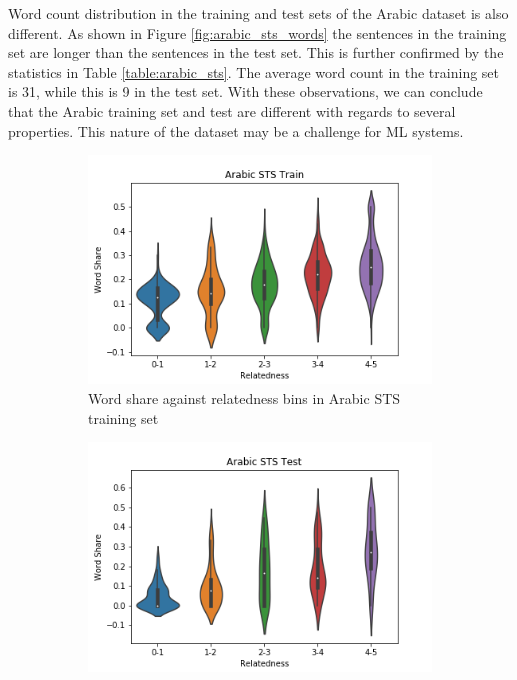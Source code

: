\begin{enumerate}
Word count distribution in the training and test sets of the Arabic dataset is also different. As shown in Figure \ref{fig:arabic_sts_words} the sentences in the training set are longer than the sentences in the test set. This is further confirmed by the statistics in Table \ref{table:arabic_sts}. The average word count in the training set is 31, while this is 9 in the test set. With these observations, we can conclude that the Arabic training set and test are different with regards to several properties. This nature of the dataset may be a challenge for ML systems.

\begin{figure}
	\captionsetup[subfigure]{justification=centering}
	\centering
	\begin{subfigure}[b]{.5\textwidth}
		\centering
		\includegraphics[width=\textwidth]{figures/semantic_textual_similarity/introduction/arabic_sts_train_word_share.png}
		\caption{Word share against relatedness bins in Arabic STS training set}
		\label{fig:arabic_sts_train_word_share}
	\end{subfigure}%
	\begin{subfigure}[b]{.5\textwidth}
		\centering
		\includegraphics[width=\textwidth]{figures/semantic_textual_similarity/introduction/arabic_sts_test_word_share.png}

\end{subfigure}
\end{figure}
\end{enumerate}
